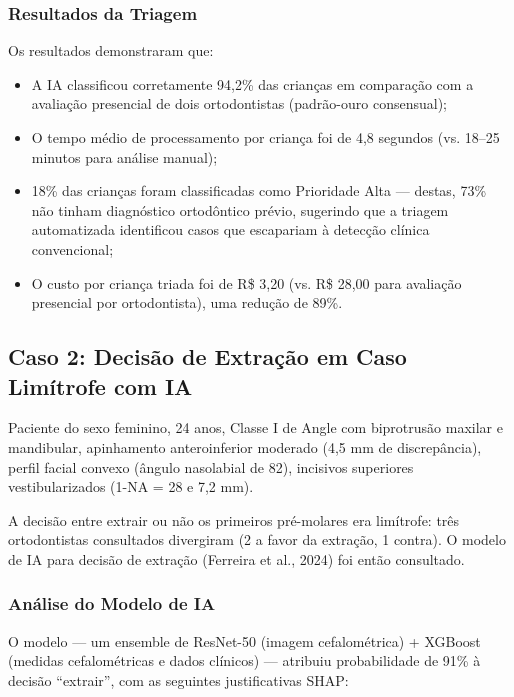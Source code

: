 \subsubsection{Resultados da Triagem}

Os resultados demonstraram que:
\begin{itemize}
    \item A IA classificou corretamente 94,2\% das crianças em comparação com a avaliação presencial de dois ortodontistas (padrão-ouro consensual);
    \item O tempo médio de processamento por criança foi de 4,8 segundos (vs. 18--25 minutos para análise manual);
    \item 18\% das crianças foram classificadas como Prioridade Alta --- destas, 73\% não tinham diagnóstico ortodôntico prévio, sugerindo que a triagem automatizada identificou casos que escapariam à detecção clínica convencional;
    \item O custo por criança triada foi de R\$ 3,20 (vs. R\$ 28,00 para avaliação presencial por ortodontista), uma redução de 89\%.
\end{itemize}

\subsection{Caso 2: Decisão de Extração em Caso Limítrofe com IA}

Paciente do sexo feminino, 24 anos, Classe I de Angle com biprotrusão maxilar e mandibular, apinhamento anteroinferior moderado (4,5 mm de discrepância), perfil facial convexo (ângulo nasolabial de 82\textdegree{}), incisivos superiores vestibularizados (1-NA = 28\textdegree{} e 7,2 mm).

A decisão entre extrair ou não os primeiros pré-molares era limítrofe: três ortodontistas consultados divergiram (2 a favor da extração, 1 contra). O modelo de IA para decisão de extração (Ferreira et al., 2024) foi então consultado.

\subsubsection{Análise do Modelo de IA}

O modelo --- um ensemble de ResNet-50 (imagem cefalométrica) + XGBoost (medidas cefalométricas e dados clínicos) --- atribuiu probabilidade de 91\% à decisão ``extrair'', com as seguintes justificativas SHAP:

